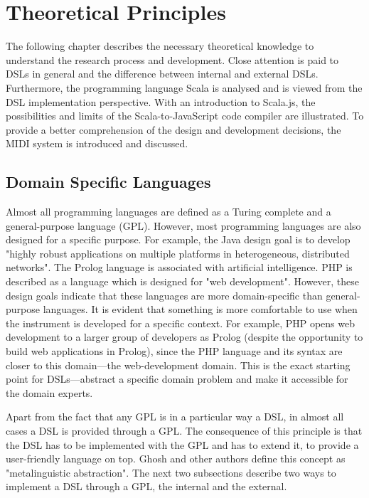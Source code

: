 \chapter{Theoretical Principles}
\label{THEO}
The following chapter describes the necessary theoretical knowledge to understand the research process and development. Close attention is paid to DSLs in general and the difference between internal and external DSLs. Furthermore, the programming language Scala is analysed and is viewed from the DSL implementation perspective. With an introduction to Scala.js, the possibilities and limits of the Scala-to-JavaScript code compiler are illustrated. To provide a better comprehension of the design and development decisions, the MIDI system is introduced and discussed.

\section{Domain Specific Languages}
\label{THEO_DSL}
Almost all programming languages are defined as a Turing complete and a general-purpose language (GPL). However, most programming languages are also designed for a specific purpose. For example, the Java design goal is to develop "highly robust applications on multiple platforms in heterogeneous, distributed networks".\cite{Gosling1996} The Prolog language is associated with artificial intelligence.\cite{Bowen1981} PHP is described as a language which is designed for "web development".\cite{ThePHPGroup} However, these design goals indicate that these languages are more domain-specific than general-purpose languages.\cite{Mernik2005} It is evident that something is more comfortable to use when the instrument is developed for a specific context. For example, PHP opens web development to a larger group of developers as Prolog (despite the opportunity to build web applications in Prolog), since the PHP language and its syntax are closer to this domain—the web-development domain. This is the exact starting point for DSLs—abstract a specific domain problem and make it accessible for the domain experts.

Apart from the fact that any GPL is in a particular way a DSL, in almost all cases a DSL is provided through a GPL. The consequence of this principle is that the DSL has to be implemented with the GPL and has to extend it, to provide a user-friendly language on top.\cite{Ghosh2010} Ghosh and other authors define this concept as "metalinguistic abstraction"\cite[p. 15]{Ghosh2010}. The next two subsections describe two ways to implement a DSL through a GPL, the internal and the external.

